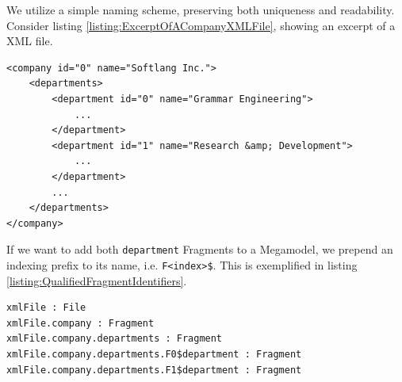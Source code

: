 We utilize a simple naming scheme, preserving both uniqueness and readability.
Consider listing \ref{listing:ExcerptOfACompanyXMLFile}, showing an excerpt of a \gls{XML} file.
\begin{lstlisting}[caption={Excerpt of a Company XML file},label={listing:ExcerptOfACompanyXMLFile}]
<company id="0" name="Softlang Inc.">
    <departments>
        <department id="0" name="Grammar Engineering">
			...
        </department>
        <department id="1" name="Research &amp; Development">
            ...
        </department>
        ...
    </departments>
</company>
\end{lstlisting}
If we want to add both \texttt{department} \glspl{Fragment} to a \gls{Megamodel}, we prepend an indexing prefix to its name, i.e. \texttt{F<index>\$}.
This is exemplified in listing \ref{listing:QualifiedFragmentIdentifiers}.
\begin{lstlisting}[caption={Qualified Fragment Identifiers},label={listing:QualifiedFragmentIdentifiers}]
xmlFile : File
xmlFile.company : Fragment
xmlFile.company.departments : Fragment
xmlFile.company.departments.F0$department : Fragment
xmlFile.company.departments.F1$department : Fragment
\end{lstlisting}


